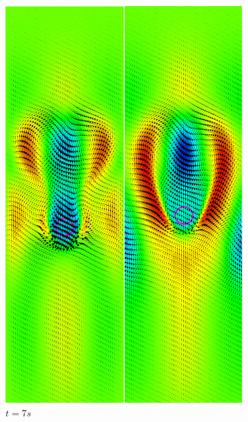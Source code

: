 \begin{figure}[H]
	\centering
	\begin{subfigure}[ht!]{0.3\textwidth}
		\centering
		\includegraphics[width=1\textwidth]{compare_CL/t=7s.png}
		\caption{$t=7s$}
	\end{subfigure}
	\begin{subfigure}[ht!]{0.3\textwidth}
		\centering

\end{subfigure}
\end{figure}
